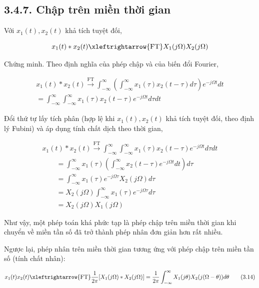 \documentclass[
  10
]{article}
\begin{document}
\subsection{3.4.7. Chập trên miền thời
gian}\label{chux1eadp-truxean-miux1ec1n-thux1eddi-gian}

Với \(x _ { 1 } ( t ) , x _ { 2 } ( t )\) khả tích tuyệt đối,

\[
x _ {1} (t) * x _ {2} (t) \xleftrightarrow {\mathrm{FT}} X _ {1} (j \Omega) X _ {2} (j \Omega)
\]

Chứng minh. Theo định nghĩa của phép chập và của biến đổi Fourier,

\[
\begin{array}{c} x _ {1} (t) * x _ {2} (t) \xrightarrow {\mathrm{FT}} \int_ {- \infty} ^ {\infty} \left(\int_ {- \infty} ^ {\infty} x _ {1} (\tau) x _ {2} (t - \tau) d \tau\right) e ^ {- j \Omega t} d t \\ = \int_ {- \infty} ^ {\infty} \int_ {- \infty} ^ {\infty} x _ {1} (\tau) x _ {2} (t - \tau) e ^ {- j \Omega t} d \tau d t \end{array}
\]

Đổi thứ tự lấy tích phân (hợp lệ khi
\(x _ { 1 } ( t ) , x _ { 2 } ( t )\) khả tích tuyệt đối, theo định lý
Fubini) và áp dụng tính chất dịch theo thời gian,

\[
\begin{array}{l} x _ {1} (t) * x _ {2} (t) \xrightarrow {\mathrm{FT}} \int_ {- \infty} ^ {\infty} \int_ {- \infty} ^ {\infty} x _ {1} (\tau) x _ {2} (t - \tau) e ^ {- j \Omega t} d \tau d t \\ \qquad = \int_ {- \infty} ^ {\infty} x _ {1} (\tau) \left(\int_ {- \infty} ^ {\infty} x _ {2} (t - \tau) e ^ {- j \Omega t} d t\right) d \tau \\ \qquad = \int_ {- \infty} ^ {\infty} x _ {1} (\tau) e ^ {- j \Omega \tau} X _ {2} (j \Omega) d \tau \\ \qquad = X _ {2} (j \Omega) \int_ {- \infty} ^ {\infty} x _ {1} (\tau) e ^ {- j \Omega \tau} d \tau \\ \qquad = X _ {2} (j \Omega) X _ {1} (j \Omega) \end{array}
\]

Như vậy, một phép toán khá phức tạp là phép chập trên miền thời gian khi
chuyển về miền tần số đã trở thành phép nhân đơn giản hơn rất nhiều.

Ngược lại, phép nhân trên miền thời gian tương ứng với phép chập trên
miền tần số (tính chất nhân):

\[
x _ {1} (t) x _ {2} (t) \xleftrightarrow {\mathrm{FT}} \frac {1}{2 \pi} [ X _ {1} (j \Omega) * X _ {2} (j \Omega) ] = \frac {1}{2 \pi} \int_ {- \infty} ^ {\infty} X _ {1} (j \theta) X _ {2} (j (\Omega - \theta)) d \theta\tag{3.14}
\]
\end{document}
